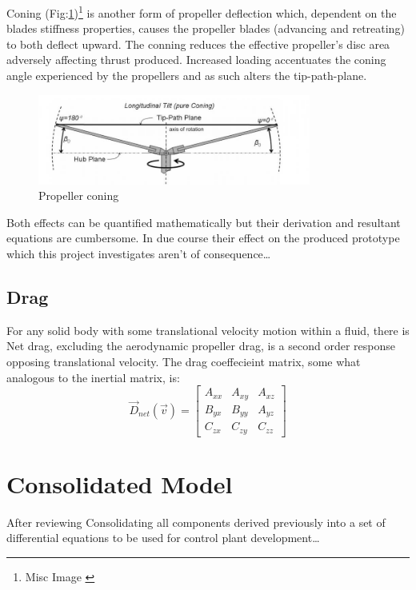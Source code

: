 \par
Coning (Fig:\ref{fig:prop-coning})\footnote{Misc Image \cite{.}} is another form of propeller deflection which, dependent on the blades stiffness properties, causes the propeller blades (advancing and retreating) to both deflect upward. The conning reduces the effective propeller's disc area adversely affecting thrust produced. Increased loading accentuates the coning angle experienced by the propellers and as such alters the tip-path-plane.
\begin{figure}[hbtp]
\centering
\includegraphics[width=0.8\textwidth]{figs/prop-coning}
\caption{Propeller coning}
\label{fig:prop-coning}
\end{figure}
\par
Both effects can be quantified mathematically but their derivation and resultant equations are cumbersome. In due course their effect on the produced prototype which this project investigates aren't of consequence\ldots
\subsection{Drag}
\label{subsec:dynamics.aero.drag}
For any solid body with some translational velocity motion within a fluid, there is 
Net drag, excluding the aerodynamic propeller drag, is a second order response opposing translational velocity. The drag coeffecieint matrix, some what analogous to the inertial matrix, is:
\begin{equation}
\vec{D}_{net}(\vec{v})=\begin{bmatrix}
A_{xx} & A_{xy} & A_{xz}\\
B_{yx} & B_{yy} & A_{yz}\\
C_{zx} & C_{zy} & C_{zz}
\end{bmatrix}
\end{equation}
\section{Consolidated Model}
\label{sec:dynamics.model}%
After reviewing Consolidating all components derived previously into a set of differential equations to be used for control plant development\ldots